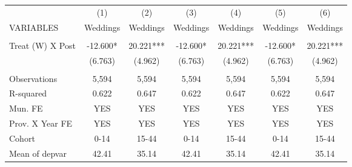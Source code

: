 \begin{tabular}{lcccccc} \hline
 & (1) & (2) & (3) & (4) & (5) & (6) \\
VARIABLES & Weddings & Weddings & Weddings & Weddings & Weddings & Weddings \\ \hline
 &  &  &  &  &  &  \\
Treat (W) X Post & -12.600* & 20.221*** & -12.600* & 20.221*** & -12.600* & 20.221*** \\
 & (6.763) & (4.962) & (6.763) & (4.962) & (6.763) & (4.962) \\
 &  &  &  &  &  &  \\
Observations & 5,594 & 5,594 & 5,594 & 5,594 & 5,594 & 5,594 \\
R-squared & 0.622 & 0.647 & 0.622 & 0.647 & 0.622 & 0.647 \\
Mun. FE & YES & YES & YES & YES & YES & YES \\
Prov. X Year FE & YES & YES & YES & YES & YES & YES \\
Cohort & 0-14 & 15-44 & 0-14 & 15-44 & 0-14 & 15-44 \\
 Mean of depvar & 42.41 & 35.14 & 42.41 & 35.14 & 42.41 & 35.14 \\ \hline
\end{tabular}
